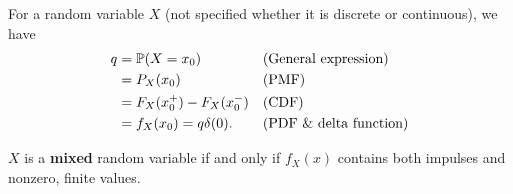\begin{theorem}
    For a random variable $X$ (not specified whether it is discrete or continuous), we have 
    \begin{align*}
        q
        &= \P{X=x_0} && \text{(General expression)} \\
        &= P_X(x_0) && \text{(PMF)} \\
        &= F_X(x_0^+) - F_X(x_0^-) && \text{(CDF)} \\
        &= f_X(x_0) = q\delta(0). && \text{(PDF \& delta function)}
    \end{align*}
\end{theorem}

\begin{theorem}
    $X$ is a \textbf{mixed} random variable if and only if $f_X(x)$ contains both impulses and nonzero, finite values.
\end{theorem}